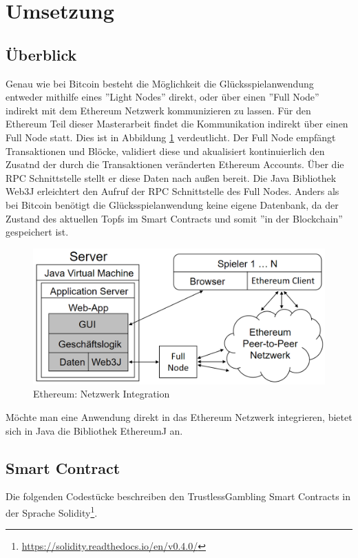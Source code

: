 \section{Umsetzung}
\subsection{Überblick}
Genau wie bei Bitcoin besteht die Möglichkeit die Glücksspielanwendung entweder mithilfe eines ''Light Nodes'' direkt, oder über einen ''Full Node'' indirekt mit dem Ethereum Netzwerk kommunizieren zu lassen. Für den Ethereum Teil dieser Masterarbeit findet die Kommunikation indirekt über einen Full Node statt. Dies ist in Abbildung \ref{fig:anwendung_aufbau} verdeutlicht. Der Full Node empfängt Transaktionen und Blöcke, validiert diese und akualisiert kontinuierlich den Zusatnd der durch die Transaktionen veränderten Ethereum Accounts. Über die RPC Schnittstelle stellt er diese Daten nach außen bereit. Die Java Bibliothek Web3J \cite{web3j} erleichtert den Aufruf der RPC Schnittstelle des Full Nodes. Anders als bei Bitcoin benötigt die Glücksspielanwendung keine eigene Datenbank, da der Zustand des aktuellen Topfs im Smart Contracts und somit ''in der Blockchain'' gespeichert ist.
\begin{figure}[H]
\centering
\includegraphics[width=1\linewidth]{Figures/umsetzung_eth/anwendung_aufbau}
\decoRule
\caption{Ethereum: Netzwerk Integration}
\label{fig:anwendung_aufbau}
\end{figure}

Möchte man eine Anwendung direkt in das Ethereum Netzwerk integrieren, bietet sich in Java die Bibliothek EthereumJ \cite{ethereumj} an. 

\subsection{Smart Contract}
Die folgenden Codestücke beschreiben den TrustlessGambling Smart Contracts in der Sprache Solidity\footnote{\url{https://solidity.readthedocs.io/en/v0.4.0/}}.

